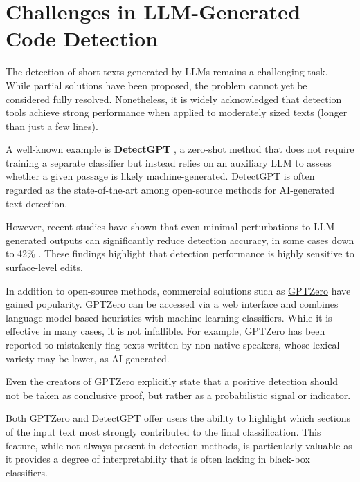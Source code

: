 \clearpage
\section{Challenges in LLM-Generated Code Detection}
The detection of short texts generated by LLMs remains 
a challenging task. While partial solutions have been 
proposed, the problem cannot yet be considered fully 
resolved. Nonetheless, it is widely acknowledged that 
detection tools achieve strong performance when applied 
to moderately sized texts (longer than just a few lines).

A well-known example is \textbf{DetectGPT}
\cite{mitchell2023detectgpt}, a 
zero-shot method that does not require training a 
separate classifier but instead relies on an 
auxiliary LLM to assess whether a given passage is 
likely machine-generated. 
DetectGPT is often regarded as the state-of-the-art 
among open-source methods for AI-generated text detection.

However, recent studies have shown that even minimal 
perturbations to LLM-generated outputs can significantly 
reduce detection accuracy, in some cases down to 
42\% \cite{krishna2023paraphrasing}. These findings 
highlight that detection performance is highly 
sensitive to surface-level edits.

In addition to open-source methods, commercial 
solutions such as \href{https://gptzero.me}{GPTZero} 
have gained 
popularity. GPTZero can be accessed via a web 
interface and combines language-model-based heuristics 
with machine learning classifiers. While it is 
effective in many cases, it is not infallible. 
For example, GPTZero has been reported to mistakenly 
flag texts written by non-native speakers, 
whose lexical variety may be lower, as AI-generated.

Even the creators of GPTZero explicitly state 
that a positive detection should not be taken as 
conclusive proof, but rather as a probabilistic 
signal or indicator.

Both GPTZero and DetectGPT offer users the ability to highlight which sections of the input text most strongly contributed to the final classification. This feature, while not always present in detection methods, is particularly valuable as it provides a degree of interpretability that is often lacking in black-box classifiers.


\vspace{1\baselineskip}
\noindent
